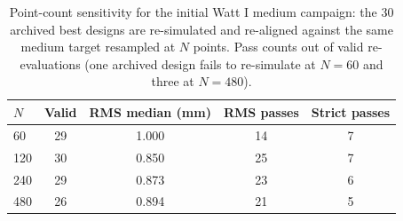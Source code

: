 \begin{table}[H]
\caption{Point-count sensitivity for the initial Watt I medium campaign: the 30 archived best designs are re-simulated and re-aligned against the same medium target resampled at $N$ points. Pass counts out of valid re-evaluations (one archived design fails to re-simulate at $N=60$ and three at $N=480$).}
\label{tab:n_sensitivity}
\centering
\begin{tabular}{@{}lcccc@{}}
\hline
$N$ & Valid & RMS median (mm) & RMS passes & Strict passes \\
\hline
60 & 29 & 1.000 & 14 & 7 \\
120 & 30 & 0.850 & 25 & 7 \\
240 & 29 & 0.873 & 23 & 6 \\
480 & 26 & 0.894 & 21 & 5 \\
\hline
\end{tabular}
\end{table}